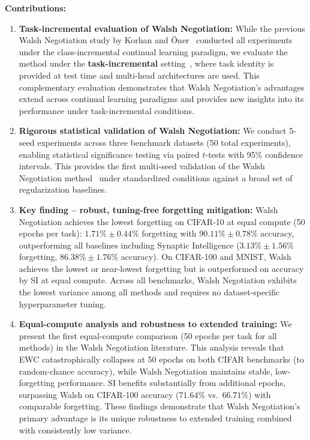 \documentclass[preprint,review,12pt]{elsarticle}
\begin{document}
\textbf{Contributions:}
\begin{enumerate}
\item \textbf{Task-incremental evaluation of Walsh Negotiation:} While the previous Walsh Negotiation study by Korhan and {\"O}ner~\cite{korhan2023negotiated} conducted all experiments under the class-incremental continual learning paradigm, we evaluate the method under the \textbf{task-incremental} setting~\cite{van2019three}, where task identity is provided at test time and multi-head architectures are used. This complementary evaluation demonstrates that Walsh Negotiation's advantages extend across continual learning paradigms and provides new insights into its performance under task-incremental conditions.

\item \textbf{Rigorous statistical validation of Walsh Negotiation:} We conduct 5-seed experiments across three benchmark datasets (50 total experiments), enabling statistical significance testing via paired $t$-tests with 95\% confidence intervals. This provides the first multi-seed validation of the Walsh Negotiation method~\cite{korhan2023negotiated} under standardized conditions against a broad set of regularization baselines.

\item \textbf{Key finding -- robust, tuning-free forgetting mitigation:} Walsh Negotiation achieves the lowest forgetting on CIFAR-10 at equal compute (50 epochs per task): $1.71\% \pm 0.44\%$ forgetting with $90.11\% \pm 0.78\%$ accuracy, outperforming all baselines including Synaptic Intelligence ($3.13\% \pm 1.56\%$ forgetting, $86.38\% \pm 1.76\%$ accuracy). On CIFAR-100 and MNIST, Walsh achieves the lowest or near-lowest forgetting but is outperformed on accuracy by SI at equal compute. Across all benchmarks, Walsh Negotiation exhibits the lowest variance among all methods and requires no dataset-specific hyperparameter tuning.

\item \textbf{Equal-compute analysis and robustness to extended training:} We present the first equal-compute comparison (50 epochs per task for all methods) in the Walsh Negotiation literature. This analysis reveals that EWC catastrophically collapses at 50 epochs on both CIFAR benchmarks (to random-chance accuracy), while Walsh Negotiation maintains stable, low-forgetting performance. SI benefits substantially from additional epochs, surpassing Walsh on CIFAR-100 accuracy ($71.64\%$ vs.\ $66.71\%$) with comparable forgetting. These findings demonstrate that Walsh Negotiation's primary advantage is its unique robustness to extended training combined with consistently low variance.


\end{enumerate}
\end{document}
